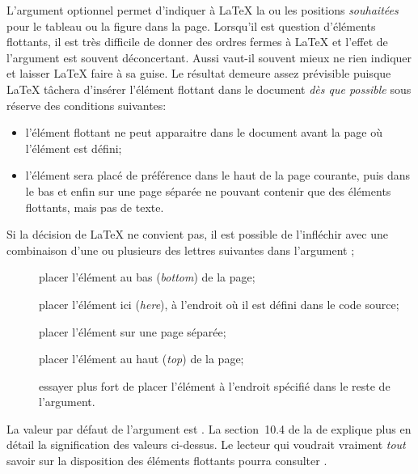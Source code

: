 L'argument optionnel  permet d'indiquer à {\LaTeX}
la ou les positions \emph{souhaitées} pour le tableau ou la figure dans la page.
Lorsqu'il est question d'éléments flottants, il est très difficile de donner des
ordres fermes à {\LaTeX} et l'effet de l'argument  est
souvent déconcertant. Aussi vaut-il souvent mieux ne rien indiquer et
laisser {\LaTeX} faire à sa guise. Le résultat demeure assez
prévisible puisque {\LaTeX} tâchera d'insérer l'élément flottant dans
le document \emph{dès que possible} sous réserve des conditions
suivantes:
\begin{itemize}
\item l'élément flottant ne peut apparaitre dans le document avant la
  page où l'élément est défini;
\item l'élément sera placé de préférence dans le haut de la page
  courante, puis dans le bas et enfin sur une page séparée ne pouvant
  contenir que des éléments flottants, mais pas de texte.
\end{itemize}

Si la décision de {\LaTeX} ne convient pas, il est possible de
l'infléchir avec une combinaison d'une ou plusieurs des lettres
suivantes dans l'argument ;
\begin{description}
\item[\normalfont{}] placer l'élément au bas (\emph{bottom}) de la page;
\item[\normalfont{}] placer l'élément ici (\emph{here}), à
  l'endroit où il est défini dans le code source;
\item[\normalfont{}] placer l'élément sur une page séparée;
\item[\normalfont{}] placer l'élément au haut (\emph{top}) de la page;
\item[\normalfont\code{!}] essayer plus fort de placer l'élément à
  l'endroit spécifié dans le reste de l'argument.
\end{description}
La valeur par défaut de l'argument  est . La
section~10.4 de la %
de  explique plus en détail la signification des valeurs
ci-dessus. Le lecteur qui voudrait vraiment \emph{tout} savoir sur la
disposition des éléments flottants pourra consulter
\cite{Mittelbach:floats:2014}.

